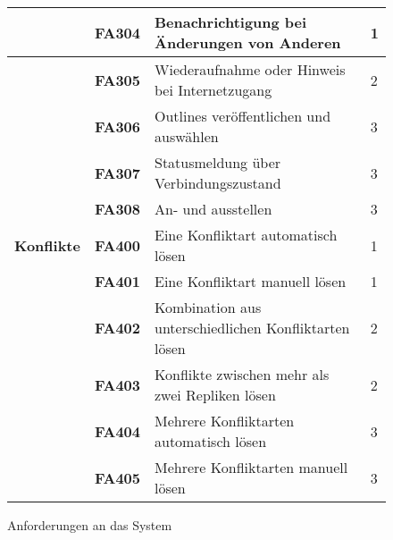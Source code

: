 \begin{figure}[H]
\begin{tabular}{ | l | l | l | l |}
    & \textbf{FA304} & Benachrichtigung bei Änderungen von Anderen & 1\\ \hline
    & \textbf{FA305} & Wiederaufnahme oder Hinweis bei Internetzugang & 2\\ \hline
    & \textbf{FA306} & Outlines veröffentlichen und auswählen & 3\\ \hline
    & \textbf{FA307} & Statusmeldung über Verbindungszustand & 3\\ \hline
    & \textbf{FA308} & An- und ausstellen & 3\\ \hline
    \hline
    \textbf{Konflikte} & \textbf{FA400} & Eine Konfliktart automatisch lösen & 1\\ \hline
    & \textbf{FA401} & Eine Konfliktart manuell lösen & 1\\ \hline
    & \textbf{FA402} & Kombination aus unterschiedlichen Konfliktarten lösen & 2\\ \hline
    & \textbf{FA403} & Konflikte zwischen mehr als zwei Repliken lösen & 2\\ \hline
    & \textbf{FA404} & Mehrere Konfliktarten automatisch lösen & 3\\ \hline
    & \textbf{FA405} & Mehrere Konfliktarten manuell lösen & 3\\ \hline
    \hline
  \end{tabular}
  \caption{Anforderungen an das System}
  \label{figure:af}
\end{figure}

\clearpage
\setlength{\hoffset}{0mm}
